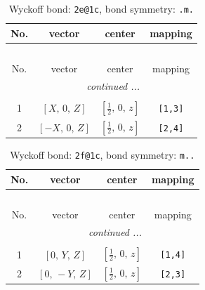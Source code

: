 \documentclass[fleqn,8pt]{jsarticle}
\begin{document}
\renewcommand{\arraystretch}{1.2}
\begin{longtable}{cccc}
\caption{Wyckoff bond: {\tt 2e@1c}, bond symmetry: {\tt .m.}}
 \\
 \hline \hline
No. & vector & center & mapping \\ \hline \endfirsthead

\multicolumn{3}{l}{\tablename\ \thetable{}} \\
 \hline \hline
No. & vector & center & mapping \\ \hline \endhead

 \hline \hline
\multicolumn{3}{r}{\footnotesize\it continued ...} \\ \endfoot

 \hline \hline
\multicolumn{3}{r}{} \\ \endlastfoot

1 & $\left[ X,\, 0,\, Z \right]$ & $\left[ \frac{1}{2},\, 0,\, z \right]$ & {\tt [1,3]} \\ \hline
2 & $\left[ - X,\, 0,\, Z \right]$ & $\left[ \frac{1}{2},\, 0,\, z \right]$ & {\tt [2,4]} \\
\end{longtable}
\renewcommand{\arraystretch}{1.2}
\begin{longtable}{cccc}
\caption{Wyckoff bond: {\tt 2f@1c}, bond symmetry: {\tt m..}}
 \\
 \hline \hline
No. & vector & center & mapping \\ \hline \endfirsthead

\multicolumn{3}{l}{\tablename\ \thetable{}} \\
 \hline \hline
No. & vector & center & mapping \\ \hline \endhead

 \hline \hline
\multicolumn{3}{r}{\footnotesize\it continued ...} \\ \endfoot

 \hline \hline
\multicolumn{3}{r}{} \\ \endlastfoot

1 & $\left[ 0,\, Y,\, Z \right]$ & $\left[ \frac{1}{2},\, 0,\, z \right]$ & {\tt [1,4]} \\ \hline
2 & $\left[ 0,\, - Y,\, Z \right]$ & $\left[ \frac{1}{2},\, 0,\, z \right]$ & {\tt [2,3]} \\
\end{longtable}
\renewcommand{\arraystretch}{1.2}
\end{document}
